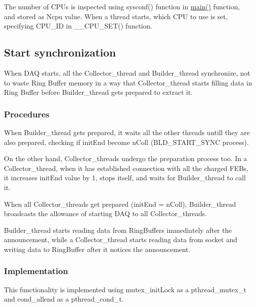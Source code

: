 The number of C\+P\+Us is inspected using {\ttfamily sysconf()} function in {\ttfamily \hyperlink{Master_8cpp_a3c04138a5bfe5d72780bb7e82a18e627}{main()}} function, and stored as {\ttfamily Ncpu} value. When a thread starts, which C\+PU to use is set, specifying {\ttfamily C\+P\+U\+\_\+\+ID} in {\ttfamily \+\_\+\+\_\+\+C\+P\+U\+\_\+\+S\+E\+T()} function.\hypertarget{index_START_SYNC}{}\subsection{Start synchronization}\label{index_START_SYNC}
When D\+AQ starts, all the Collector\+\_\+thread and Builder\+\_\+thread synchronize, not to waste Ring Buffer memory in a way that Collector\+\_\+thread starts filling data in Ring Buffer before Builder\+\_\+thread gets prepared to extract it.\hypertarget{index_START_SYNC_DETAILS}{}\subsubsection{Procedures}\label{index_START_SYNC_DETAILS}

\begin{DoxyItemize}
\item When Builder\+\_\+thread gets prepared, it waits all the other threads untill they are also prepared, checking if {\ttfamily init\+End} become n\+Coll (B\+L\+D\+\_\+\+S\+T\+A\+R\+T\+\_\+\+S\+Y\+NC process).
\item On the other hand, Collector\+\_\+threads undergo the preparation process too. In a Collector\+\_\+thread, when it has established connection with all the charged F\+E\+Bs, it increases {\ttfamily init\+End} value by 1, stops itself, and waits for Builder\+\_\+thread to call it.
\item When all Collector\+\_\+threads get prepared ({\ttfamily init\+End} = {\ttfamily n\+Coll}), Builder\+\_\+thread broadcasts the allowance of starting D\+AQ to all Collector\+\_\+threads.
\item Builder\+\_\+thread starts reading data from Ring\+Buffers immediately after the announcement, while a Collector\+\_\+thread starts reading data from socket and writing data to Ring\+Buffer after it notices the announcement.
\end{DoxyItemize}\hypertarget{index_START_SYNC_PTHREAD}{}\subsubsection{Implementation}\label{index_START_SYNC_PTHREAD}
This functionality is implemented using {\ttfamily mutex\+\_\+init\+Lock} as a {\ttfamily pthread\+\_\+mutex\+\_\+t} and {\ttfamily cond\+\_\+allend} as a {\ttfamily pthread\+\_\+cond\+\_\+t}.


